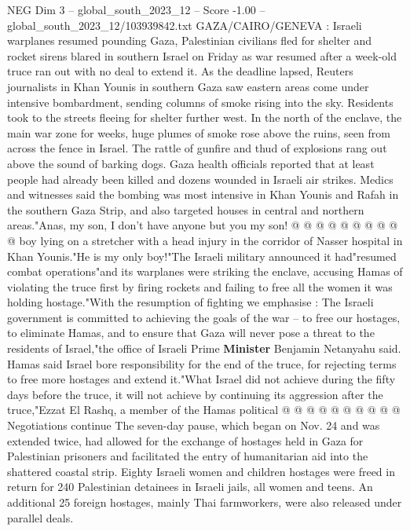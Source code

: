 \begin{textsample}{NEG Dim 3 – global\_south\_2023\_12 – Score -1.00 – global\_south\_2023\_12/103939842.txt}  \label{ex:f3_neg_039}
GAZA/CAIRO/GENEVA : Israeli warplanes resumed pounding Gaza, Palestinian civilians fled for shelter and rocket sirens blared in southern Israel on Friday as war resumed after a week-old truce ran out with no deal to extend it.
As the deadline lapsed, Reuters journalists in Khan Younis in southern Gaza saw eastern areas come under intensive bombardment, sending columns of smoke rising into the sky.
Residents took to the streets fleeing for shelter further west.
In the north of the enclave, the main war zone for weeks, huge plumes of smoke rose above the ruins, seen from across the fence in Israel.
The rattle of gunfire and thud of explosions rang out above the sound of barking dogs.
Gaza health officials reported that at least people had already been killed and dozens wounded in Israeli air strikes.
Medics and witnesses said the bombing was most intensive in Khan Younis and Rafah in the southern Gaza Strip, and also targeted houses in central and northern areas."Anas, my son, I don't have anyone but you my son! @ @ @ @ @ @ @ @ @ @ boy lying on a stretcher with a head injury in the corridor of Nasser hospital in Khan Younis."He is my only boy!"The Israeli military announced it had"resumed combat operations"and its warplanes were striking the enclave, accusing Hamas of violating the truce first by firing rockets and failing to free all the women it was holding hostage."With the resumption of fighting we emphasise : The Israeli government is committed to achieving the goals of the war -- to free our hostages, to eliminate Hamas, and to ensure that Gaza will never pose a threat to the residents of Israel,"the office of Israeli Prime \textbf{Minister} Benjamin Netanyahu said.
Hamas said Israel bore responsibility for the end of the truce, for rejecting terms to free more hostages and extend it."What Israel did not achieve during the fifty days before the truce, it will not achieve by continuing its aggression after the truce,"Ezzat El Rashq, a member of the Hamas political @ @ @ @ @ @ @ @ @ @ Negotiations continue The seven-day pause, which began on Nov. 24 and was extended twice, had allowed for the exchange of hostages held in Gaza for Palestinian prisoners and facilitated the entry of humanitarian aid into the shattered coastal strip.
Eighty Israeli women and children hostages were freed in return for 240 Palestinian detainees in Israeli jails, all women and teens.
An additional 25 foreign hostages, mainly Thai farmworkers, were also released under parallel deals.

\end{textsample}
